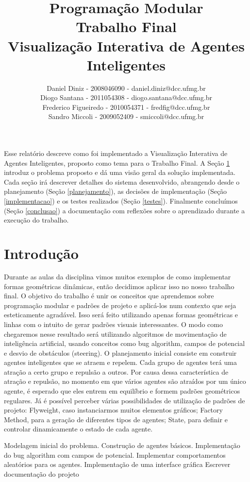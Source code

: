 \documentclass[12pt]{article}
\title{Programação Modular \\ Trabalho Final \\ Visualização Interativa de Agentes Inteligentes}
\author{Daniel Diniz - 2008046090 - daniel.diniz@dcc.ufmg.br\\
		Diogo Santana - 2011054308 - diogo.santana@dcc.ufmg.br\\
		Frederico Figueiredo - 2010054371 - fredfig@dcc.ufmg.br\\
		Sandro Miccoli - 2009052409 - smiccoli@dcc.ufmg.br}
\begin{document}
\maketitle


\begin{resumo}

Esse relatório descreve como foi implementado a Visualização Interativa de Agentes Inteligentes, proposto como tema para o Trabalho Final. A Seção \ref{introducao} introduz o problema proposto e dá uma visão geral da solução implementada. Cada seção irá descrever detalhes do sistema desenvolvido, abrangendo desde o planejamento (Seção \ref{planejamento}), as decisões de implementação (Seção \ref{implementacao}) e os testes realizados (Seção \ref{testes}). Finalmente concluímos (Seção \ref{conclusao}) a documentação com reflexões sobre o aprendizado durante a execução do trabalho.

\end{resumo}

\section{Introdução}
\label{introducao}

Durante as aulas da disciplina vimos muitos exemplos de como implementar formas geométricas dinâmicas, então decidimos aplicar isso no nosso trabalho final. O objetivo do trabalho é unir os conceitos que aprendemos sobre programação modular e padrões de projeto e aplicá-los num contexto que seja esteticamente agradável. Isso será feito utilizando apenas formas geométricas e linhas com o intuito de gerar padrões visuais interessantes.
O modo como chegaremos nesse resultado será utilizando algoritmos de movimentação de inteligência artificial, usando conceitos como bug algorithm, campos de potencial e desvio de obstáculos (steering).
O planejamento inicial consiste em construir agentes inteligentes que se atraem e repelem. Cada grupo de agentes terá uma atração a certo grupo e repulsão a outros. Por causa dessa característica de atração e repulsão, no momento em que vários agentes são atraídos por um único agente, é esperado que eles entrem em equilíbrio e formem padrões geométricos regulares.
Já é possível perceber várias possibilidades de utilização de padrões de projeto:  Flyweight, caso instanciarmos muitos elementos gráficos; Factory Method, para a geração de diferentes tipos de agentes; State, para definir e controlar dinamicamente o estado de cada agente.

Modelagem inicial do problema.
Construção de agentes básicos.
Implementação do bug algorithm com campos de potencial.
Implementar comportamentos aleatórios para os agentes.
Implementação de uma interface gráfica
Escrever documentação do projeto
\end{document}
